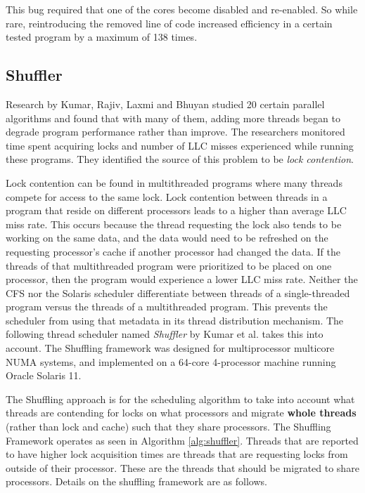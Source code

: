 \documentclass{sig-alternate}
\begin{document}
This bug required that one of the cores become disabled and re-enabled. So while rare, reintroducing the removed line of code increased efficiency in a certain tested program by a maximum of 138 times.~\cite{Lozi:2016}

\subsection{Shuffler}
\label{sec:shuffler}

Research by Kumar, Rajiv, Laxmi and Bhuyan studied 20 certain parallel algorithms and found that with many of them, adding more threads began to degrade program performance rather than improve. The researchers monitored time spent acquiring locks and number of LLC misses experienced while running these programs. They identified the source of this problem to be \emph{lock contention}.

Lock contention can be found in multithreaded programs where many threads compete for access to the same lock. Lock contention between threads in a program that reside on different processors leads to a higher than average LLC miss rate. This occurs because the thread requesting the lock also tends to be working on the same data, and the data would need to be refreshed on the requesting processor's cache if another processor had changed the data. If the threads of that multithreaded program were prioritized to be placed on one processor, then the program would experience a lower LLC miss rate. Neither the CFS nor the Solaris scheduler differentiate between threads of a single-threaded program versus the threads of a multithreaded program. This prevents the scheduler from using that metadata in its thread distribution mechanism. The following thread scheduler named \emph{Shuffler} by Kumar et al. takes this into account. The Shuffling framework was designed for multiprocessor multicore NUMA systems, and implemented on a 64-core 4-processor machine running Oracle Solaris 11.~\cite{KumarEtal:2014}

The Shuffling approach is for the scheduling algorithm to take into account what threads are contending for locks on what processors and migrate \textbf{whole threads} (rather than lock and cache) such that they share processors. The Shuffling Framework operates as seen in Algorithm \ref{alg:shuffler}. Threads that are reported to have higher lock acquisition times are threads that are requesting locks from outside of their processor. These are the threads that should be migrated to share processors. Details on the shuffling framework are as follows.~\cite{KumarEtal:2014}
\end{document}
